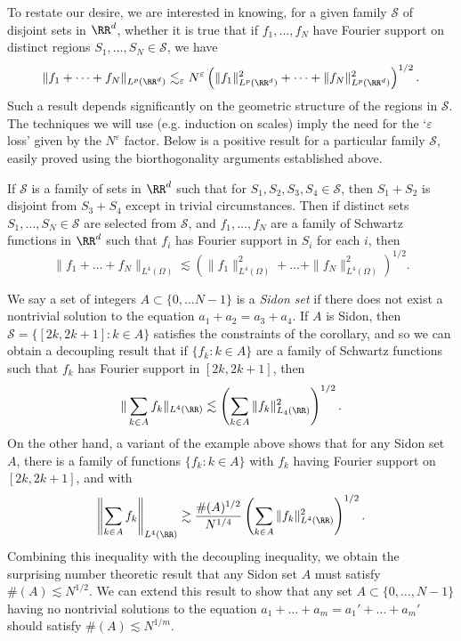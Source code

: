 To restate our desire, we are interested in knowing, for a given family $\mathcal{S}$ of disjoint sets in $\RR^d$, whether it is true that if $f_1, \dots, f_N$ have Fourier support on distinct regions $S_1, \dots, S_N \in \mathcal{S}$, we have
%
\[ \| f_1 + \dots + f_N \|_{L^p(\RR^d)} \lesssim_\varepsilon N^\varepsilon \left( \| f_1 \|_{L^p(\RR^d)}^2 + \dots + \| f_N \|_{L^p(\RR^d)}^2 \right)^{1/2}. \]
%
Such a result depends significantly on the geometric structure of the regions in $\mathcal{S}$. The techniques we will use (e.g. induction on scales) imply the need for the `$\varepsilon$ loss' given by the $N^\varepsilon$ factor. Below is a positive result for a particular family $\mathcal{S}$, easily proved using the biorthogonality arguments established above.

\begin{theorem}
  If $\mathcal{S}$ is a family of sets in $\RR^d$ such that for $S_1,S_2,S_3,S_4 \in \mathcal{S}$, then $S_1 + S_2$ is disjoint from $S_3 + S_4$ except in trivial circumstances. Then if distinct sets $S_1, \dots, S_N \in \mathcal{S}$ are selected from $\mathcal{S}$, and $f_1, \dots, f_N$ are a family of Schwartz functions in $\RR^d$ such that $f_i$ has Fourier support in $S_i$ for each $i$, then
  \[ \| f_1 + \dots + f_N \|_{L^4(\Omega)} \lesssim \left( \| f_1 \|_{L^4(\Omega)}^2 + \dots + \| f_N \|_{L^4(\Omega)}^2 \right)^{1/2}. \]
\end{theorem}

\begin{remark}
  We say a set of integers $A \subset \{ 0, \dots N-1 \}$ is a \emph{Sidon set} if there does not exist a nontrivial solution to the equation $a_1 + a_2 = a_3 + a_4$. If $A$ is Sidon, then $\mathcal{S} = \{ [2k,2k+1]: k \in A \}$ satisfies the constraints of the corollary, and so we can obtain a decoupling result that if $\{ f_k: k \in A \}$ are a family of Schwartz functions such that $f_k$ has Fourier support in $[2k,2k+1]$, then
  \[ \| \sum_{k \in A} f_k \|_{L^4(\RR)} \lesssim \left( \sum_{k \in A} \| f_k \|_{L_4(\RR)}^2 \right)^{1/2}. \]
  On the other hand, a variant of the example above shows that for any Sidon set $A$, there is a family of functions $\{ f_k : k \in A \}$ with $f_k$ having Fourier support on $[2k,2k+1]$, and with
  \[ \left\| \sum_{k \in A} f_k \right\|_{L^4(\RR)} \gtrsim \frac{\#(A)^{1/2}}{N^{1/4}} \left( \sum_{k \in A} \| f_k \|_{L^4(\RR)}^2 \right)^{1/2}. \]
  Combining this inequality with the decoupling inequality, we obtain the surprising number theoretic result that any Sidon set $A$ must satisfy $\#(A) \lesssim N^{1/2}$. We can extend this result to show that any set $A \subset \{ 0, \dots, N-1 \}$ having no nontrivial solutions to the equation $a_1 + \dots + a_m = a_1' + \dots + a_m'$ should satisfy $\#(A) \lesssim N^{1/m}$.
\end{remark}

